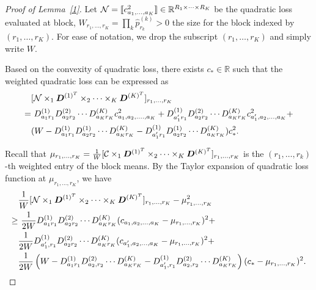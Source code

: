 \documentclass{article}
\begin{document}
\begin{appendices}
\begin{proof}[Proof of Lemma~\ref{1}]
Let $\mathcal{N}=\llbracket c^2_{a_1,\ldots,a_K} \rrbracket\in \mathbb{R}^{R_1\times\cdots\times R_K}$ be the quadratic loss evaluated at block, $W_{r_1,\ldots,r_K} = \prod_k \hat p^{(k)}_{r_k} >0$ the size for the block indexed by $(r_1,\ldots,r_K)$. For ease of notation, we drop the subscript ${(r_1,\ldots,r_K)}$ and simply write $W$.

Based on the convexity of quadratic loss, there exists $c_*\in\mathbb{R}$ such that the weighted quadratic loss can be expressed as
\begin{align}
&[\mathcal{N}\times_1\bm{D}^{(1)^T}\times_2\cdots\times_K \bm{D}^{(K)^T}]_{r_1,\ldots,r_K}\\
=&\ D_{a_1r_1}^{(1)}D_{a_2r_2}^{(2)} \cdots D_{a_Kr_K}^{(K)}c^2_{a_1,a_2,\ldots.,a_K}+D_{a_1'r_1}^{(1)}D_{a_2r_2}^{(2)} \cdots D_{a_Kr_K}^{(K)}c^2_{a_1',a_2,\ldots,a_K}+\\
&(W-D_{a_1r_1}^{(1)}D_{a_2r_2}^{(1)}\cdots D_{a_Kr_K}^{(K)}-D_{a_1'r_1}^{(1)}D_{a_2r_2}^{(1)}\cdots D_{a_Kr_K}^{(K)})c^2_*.
\end{align}

Recall that $\mu_{r_1,\ldots,r_K} ={1\over W} [\mathcal{C}\times_1\bm{D}^{(1)^T}\times_2\cdots\times_K \bm{D}^{(K)^T}]_{r_1,\ldots,r_K}$ is the $(r_1,\ldots,r_k)$-th weighted entry of the block means. 
By the Taylor expansion of quadratic loss function at $\mu_{r_1,\ldots,r_K}$, we have
\begin{align}\label{inq:taylor}
&{1\over W} [\mathcal{N}\times_1\bm{D}^{(1)^T}\times_2\cdots \times_K\bm{D}^{(K)^T}]_{r_1,\ldots,r_K}-\mu^2_{r_1,\ldots,r_K}\notag \\
\geq &\ {1\over 2W} D_{a_1r_1}^{(1)}D_{a_2r_2}^{(2)}\cdots D_{a_Kr_K}^{(K)} (c_{a_1,a_2,\ldots,a_K}-\mu_{r_1,\ldots,r_K})^2+\notag \\
 &{1\over 2W} D_{a'_1,r_1}^{(1)}D_{a_2r_2}^{(2)}\cdots D_{a_Kr_K}^{(K)}(c_{a'_1,a_2,\ldots,a_K}-\mu_{r_1,\ldots,r_K})^2 +\notag \\
&\frac{1}{2W} \left(W-D_{a_1r_1}^{(1)}D_{a_2,r_2}^{(2)}\cdots D_{a_Kr_K}^{(K)}-D_{a'_1,r_1}^{(1)}D_{a_2,r_2}^{(2)}\cdots D_{a_Kr_K}^{(K)}\right)(c_*-\mu_{r_1,\ldots,r_K})^2.
\end{align}


\end{proof}
\end{appendices}
\end{document}
